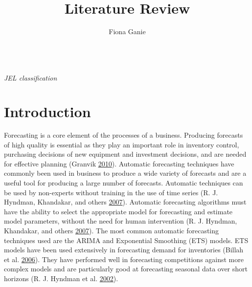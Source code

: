 \documentclass[12pt,preprint, authoryear]{elsarticle}
\numberwithin{equation}{section}
\numberwithin{figure}{section}
\numberwithin{table}{section}
\begin{document}
\begin{frontmatter}  %

\title{Literature Review}

\author[Add1]{Fiona Ganie}





\address[Add1]{University of Cape Town}



\vspace{1cm}

\begin{keyword}
\footnotesize{
 \\ \vspace{0.3cm}
\textit{JEL classification} 
}
\end{keyword}
\vspace{0.5cm}
\end{frontmatter}



\pagestyle{fancy}
\chead{}
\rhead{}
\lfoot{}
\lhead{}
\cfoot{}


\headsep 35pt %




\section{\texorpdfstring{Introduction
\label{Introduction}}{Introduction }}\label{introduction}

Forecasting is a core element of the processes of a business. Producing
forecasts of high quality is essential as they play an important role in
inventory control, purchasing decisions of new equipment and investment
decisions, and are needed for effective planning (Granvik
\protect\hyperlink{ref-granvik2010forecasting}{2010}). Automatic
forecasting techniques have commonly been used in business to produce a
wide variety of forecasts and are a useful tool for producing a large
number of forecasts. Automatic techniques can be used by non-experts
without training in the use of time series (R. J. Hyndman, Khandakar,
and others \protect\hyperlink{ref-hyndman2007automatic}{2007}).
Automatic forecasting algorithms must have the ability to select the
appropriate model for forecasting and estimate model parameters, without
the need for human intervention (R. J. Hyndman, Khandakar, and others
\protect\hyperlink{ref-hyndman2007automatic}{2007}). The most common
automatic forecasting techniques used are the ARIMA and Exponential
Smoothing (ETS) models. ETS models have been used extensively in
forecasting demand for inventories (Billah et al.
\protect\hyperlink{ref-billah2006exponential}{2006}). They have
performed well in forecasting competitions against more complex models
and are particularly good at forecasting seasonal data over short
horizons (R. J. Hyndman et al.
\protect\hyperlink{ref-hyndman2002state}{2002}).
\end{document}
